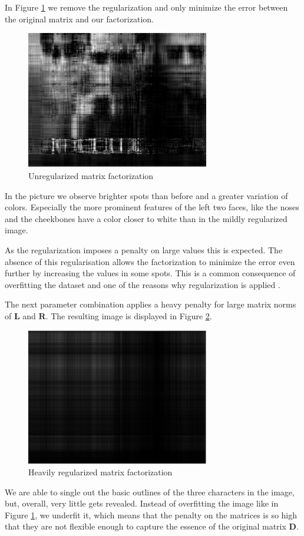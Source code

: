 \documentclass{support/acm_proc_article-sp}
\begin{document}
    In Figure \ref{fig:sgd_r10_l0} we remove the regularization and only minimize the error between the original
    matrix and our factorization.
    \begin{figure}[htbp]
        \centering
        \includegraphics[width=8cm]{images/sgd_r10_l0.png}
        \caption{Unregularized matrix factorization}
        \label{fig:sgd_r10_l0}
    \end{figure}
    In the picture we observe brighter spots than before and a greater variation of colors.
    Especially the more prominent features of the left two faces, like the noses and the cheekbones have a color closer
    to white than in the mildly regularized image.

    As the regularization imposes a penalty on large values this is expected.
    The absence of this regularisation allows the factorization to minimize the error even further by increasing
    the values in some spots.
    This is a common consequence of overfitting the dataset and one of the reasons why regularization is
    applied \cite[cf. p.227]{Murphy:2012}.

    The next parameter combination applies a heavy penalty for large matrix norms of $\mathbf{L}$ and $\mathbf{R}$.
    The resulting image is displayed in Figure \ref{fig:sgd_r10_l20}.
    \begin{figure}[htbp]
        \centering
        \includegraphics[width=8cm]{images/sgd_r10_l20.png}
        \caption{Heavily regularized matrix factorization}
        \label{fig:sgd_r10_l20}
    \end{figure}
    We are able to single out the basic outlines of the three characters in the image, but, overall, very little gets revealed.
    Instead of overfitting the image like in Figure \ref{fig:sgd_r10_l0}, we underfit it, which means that the penalty
    on the matrices is so high that they are not flexible enough to capture the essence of the original
    matrix $\mathbf{D}$.
\end{document}
